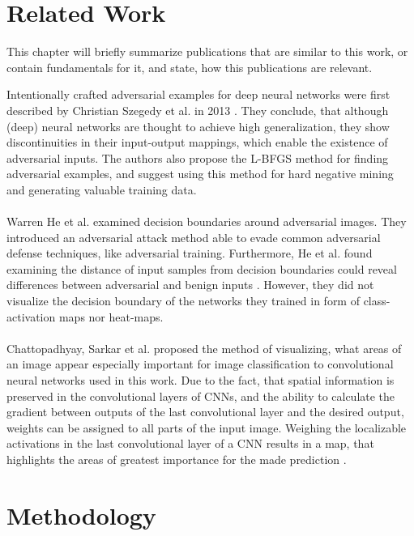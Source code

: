 \documentclass[draft,final]{vutinfth} %
\begin{document}
\chapter{Related Work}

This chapter will briefly summarize publications that are similar to this work, or contain fundamentals for it, and state, how this publications are relevant.

Intentionally crafted adversarial examples for deep neural networks were first described by Christian Szegedy et al. in 2013 \cite{Szegedy2013}.
They conclude, that although (deep) neural networks are thought to achieve high generalization, they show discontinuities in their input-output mappings, which enable the existence of adversarial inputs.
The authors also propose the L-BFGS method for finding adversarial examples, and suggest using this method for hard negative mining and generating valuable training data.\\
\\
Warren He et al. examined decision boundaries around adversarial images.
They introduced an adversarial attack method able to evade common adversarial defense techniques, like adversarial training.
Furthermore, He et al. found examining the distance of input samples from decision boundaries could reveal differences between adversarial and benign inputs \cite{He2018}.
However, they did not visualize the decision boundary of the networks they trained in form of class-activation maps nor heat-maps.\\
\\
Chattopadhyay, Sarkar et al. proposed the method of visualizing, what areas of an image appear especially important for image classification to convolutional neural networks used in this work. 
Due to the fact, that spatial information is preserved in the convolutional layers of CNNs, and the ability to calculate the gradient between outputs of the last convolutional layer and the desired output, weights can be assigned to all parts of the input image.
Weighing the localizable activations in the last convolutional layer of a CNN results in a map, that highlights the areas of greatest importance for the made prediction \cite{Chattopadhyay2017}.\\


\chapter{Methodology}
\end{document}
